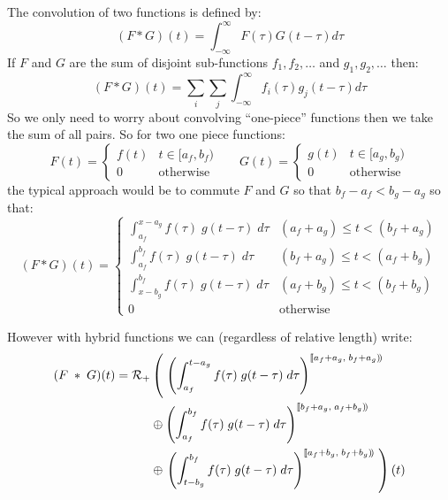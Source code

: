\documentclass{letter}
\begin{document}
	The convolution of two functions is defined by:
	\begin{equation}
		(F * G)(t) = \int_{-\infty}^\infty F(\tau) G(t-\tau) d\tau
	\end{equation}
	If $F$ and $G$ are the sum of disjoint sub-functions $f_1 , f_2, \ldots$ and $g_1, g_2, \ldots$ then:
	\begin{equation}
		(F * G)(t) = \sum_i \sum_j \int_{-\infty}^\infty f_i(\tau) g_j(t-\tau) d\tau
	\end{equation}
	So we only need to worry about convolving ``one-piece'' functions then we take the sum of all pairs.
	So for two one piece functions:
	\begin{equation*}
		F(t) = \begin{cases}
		f(t) & t \in [a_f,b_f) \\
		0 & \text{otherwise}
		\end{cases}
		\;\;\;\;\;\;
		G(t) = \begin{cases}
		g(t) & t \in [a_g, b_g) \\
		0 & \text{otherwise}
		\end{cases}
	\end{equation*}
	the typical approach would be to commute $F$ and $G$ so that $b_f - a_f < b_g - a_g$ so that:
	\begin{equation}
	(F * G)(t) = 
		\begin{cases}
			\int_{a_f}^{x-a_g} f(\tau) \; g(t-\tau) \; d\tau 	& (a_f+a_g) \leq t < (b_f+a_g) \\
			\int_{a_f}^{b_f} f(\tau) \; g(t-\tau) \; d\tau		& (b_f+a_g) \leq t < (a_f+b_g) \\
			\int_{x-b_g}^{b_f} f(\tau) \; g(t-\tau) \; d\tau	& (a_f+b_g) \leq t < (b_f+b_g) \\
			0											& \text{otherwise}
		\end{cases}
	\end{equation}
	
	However with hybrid functions we can (regardless of relative length) write:
	\begin{align}
	(F \;*\; G) (t) = 
		\mathcal{R}_+ &\left( \; \left( 
			\int_{a_f}^{t-a_g} f(\tau) \; g(t-\tau) \; d\tau \right)^{[\![a_f+a_g,\; b_f+a_g)\!)} 
				\right. \notag \\ &\oplus \left( 
			\int_{a_f}^{b_f} f(\tau) \; g(t-\tau) \; d\tau \right)^{[\![b_f+a_g,\; a_f+b_g)\!)} 
				\notag \\ &\oplus \left. \left( 
			\int_{t-b_g}^{b_f} f(\tau) \; g(t-\tau) \; d\tau \right)^{[\![a_f+b_g,\; b_f+b_g)\!)} 
				\; \right)(t)
	\end{align}
	
\end{document}
